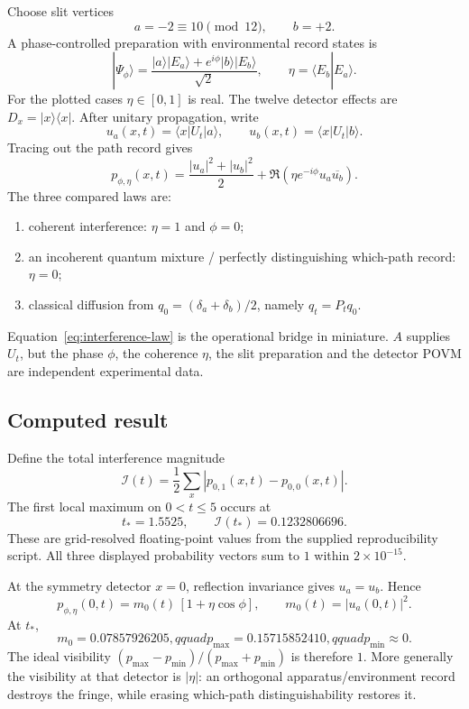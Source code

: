 \documentclass[11pt,a4paper]{article}
\theoremstyle{definition}
\theoremstyle{remark}
\begin{document}
Choose slit vertices
\[
 a=-2\equiv10\pmod{12},\qquad b=+2.
\]
A phase-controlled preparation with environmental record states is
\[
 |\Psi_{\phi}\rangle
 =\frac{|a\rangle|E_a\rangle+e^{i\phi}|b\rangle|E_b\rangle}{\sqrt2},
 \qquad \eta=\langle E_b|E_a\rangle.
\]
For the plotted cases $\eta\in[0,1]$ is real. The twelve detector effects are $D_x=|x\rangle\langle x|$. After unitary propagation, write
\[
 u_a(x,t)=\langle x|U_t|a\rangle,\qquad
 u_b(x,t)=\langle x|U_t|b\rangle.
\]
Tracing out the path record gives
\begin{equation}\label{eq:interference-law}
 p_{\phi,\eta}(x,t)
 =\frac{|u_a|^2+|u_b|^2}{2}
 +\Re\!\left(\eta e^{-i\phi}u_a\overline{u_b}\right).
\end{equation}
The three compared laws are:
\begin{enumerate}[label=(\roman*)]
\item coherent interference: $\eta=1$ and $\phi=0$;
\item an incoherent quantum mixture / perfectly distinguishing which-path record: $\eta=0$;
\item classical diffusion from $q_0=(\delta_a+\delta_b)/2$, namely $q_t=P_tq_0$.
\end{enumerate}

Equation~\eqref{eq:interference-law} is the operational bridge in miniature. $A$ supplies $U_t$, but the phase $\phi$, the coherence $\eta$, the slit preparation and the detector POVM are independent experimental data.

\subsection{Computed result}

Define the total interference magnitude
\[
 \mathcal I(t)=\frac12\sum_x|p_{0,1}(x,t)-p_{0,0}(x,t)|.
\]
The first local maximum on $0<t\le5$ occurs at
\[
 \boxed{t_*=1.5525},\qquad \boxed{\mathcal I(t_*)=0.1232806696}.
\]
These are grid-resolved floating-point values from the supplied reproducibility script. All three displayed probability vectors sum to $1$ within $2\times10^{-15}$.

At the symmetry detector $x=0$, reflection invariance gives $u_a=u_b$. Hence
\[
 p_{\phi,\eta}(0,t)=m_0(t)\,[1+\eta\cos\phi],
 \qquad m_0(t)=|u_a(0,t)|^2.
\]
At $t_*$,
\[
 m_0=0.07857926205,qquad
 p_{\max}=0.15715852410,qquad p_{\min}\approx0.
\]
The ideal visibility $(p_{\max}-p_{\min})/(p_{\max}+p_{\min})$ is therefore $1$. More generally the visibility at that detector is $|\eta|$: an orthogonal apparatus/environment record destroys the fringe, while erasing which-path distinguishability restores it.
\end{document}
